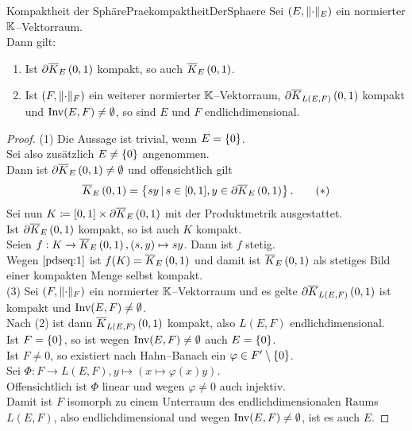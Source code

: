 \begin{lemma}{Kompaktheit der Sphäre}{PraekompaktheitDerSphaere}
Sei $(E, \lVert\cdot\rVert_E)$ ein normierter $\mathbb{K}$--Vektorraum.\\
Dann gilt:
\begin{enumerate}[(1)]
	\item Ist $\partial \overline K_{E}\left(0, 1\right)$ kompakt, so auch $\overline K_{E}\left(0, 1\right)$.
	\item Ist $(F, \lVert\cdot\rVert_F)$ ein weiterer normierter $\mathbb{K}$--Vektorraum,
	      $\partial \overline K_{L(E,F)}\left(0, 1\right)$ kompakt und $\mathop{\textrm{Inv}}\nolimits(E,F) \neq \emptyset$, so sind
	      $E$ und $F$ endlichdimensional.
\end{enumerate}
\end{lemma}
\begin{proof}
(1) Die Aussage ist trivial, wenn $E = \left\{0\right\}$.\\
Sei also zusätzlich $E \neq \left\{0\right\}$ angenommen.\\
Dann ist $\partial \overline K_{E}\left(0, 1\right) \neq \emptyset$ und offensichtlich gilt
\begin{align}\overline K_{E}\left(0, 1\right) = \left\{sy\,|\,s \in [0,1], y \in \partial \overline K_{E}\left(0, 1\right)\right\}\text. 
\tag {$\ast$}\label{pdseq:1}\end{align}
Sei nun $K\coloneqq [0,1] \times \partial \overline K_{E}\left(0, 1\right)$ mit der Produktmetrik ausgestattet.\\
Ist $\partial \overline K_{E}\left(0, 1\right)$ kompakt, so ist auch $K$ kompakt.\\
Seien $f: K \rightarrow \overline K_{E}\left(0, 1\right), (s,y) \mapsto sy$. Dann ist $f$ stetig.\\
Wegen $\eqref{pdseq:1}$ ist $f(K)=\overline K_{E}\left(0, 1\right)$ und damit ist $\overline K_{E}\left(0, 1\right)$ als
stetiges Bild einer kompakten Menge selbst kompakt.\\
(3) Sei $(F, \lVert\cdot\rVert_F)$ ein normierter $\mathbb{K}$--Vektorraum und es gelte
$\partial \overline K_{L(E,F)}\left(0, 1\right)$ ist kompakt und $\mathop{\textrm{Inv}}\nolimits(E, F) \neq \emptyset$.\\
Nach (2) ist dann $\overline K_{L(E,F)}\left(0, 1\right)$ kompakt, also $L(E,F)$
endlichdimensional.\\
Ist $F= \left\{0\right\}$, so ist wegen $\mathop{\textrm{Inv}}\nolimits(E,F) \neq \emptyset$ auch $E = \left\{0\right\}$.\\
Ist $F\neq0$, so existiert nach Hahn--Banach ein $\varphi\in F'\setminus\left\{0\right\}$.\\
Sei $\Phi: F \rightarrow L(E,F), y \mapsto (x \mapsto \varphi(x)y)$.\\
Offensichtlich ist $\Phi$ linear und wegen $\varphi \neq 0$ auch injektiv.\\
Damit ist $F$ isomorph zu einem Unterraum des endlichdimensionalen Raums
$L(E,F)$, also endlichdimensional und
wegen $\mathop{\textrm{Inv}}\nolimits(E,F) \neq \emptyset$, ist es auch $E$.
\end{proof}